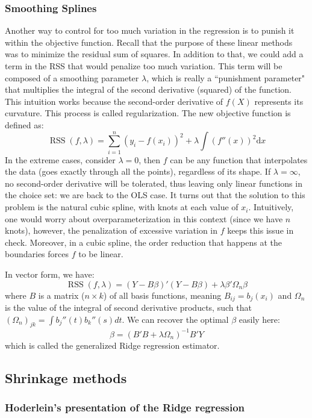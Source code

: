 \documentclass[12pt]{report}
\def\D{\mathrm{d}}
\def\D{\mathrm{d}}
\def\D{\mathrm{d}}
\begin{document}
\subsubsection{Smoothing Splines}

Another way to control for too much variation in the regression is to punish it within the objective function. Recall that the purpose of these linear methods was to minimize the residual sum of squares. In addition to that, we could add a term in the RSS that would penalize too much variation. This term will be composed of a smoothing parameter $\lambda$, which is really a ``punishment parameter" that multiplies the integral of the second derivative (squared) of the function. This intuition works because the second-order derivative of $f(X)$ represents its curvature. This process is called regularization. The new objective function is defined as: $$ \operatorname{RSS}(f,\lambda) = \sum_{i=1}^n (y_i - f(x_i))^2 + \lambda\int(f''(x))^2\D x $$
In the extreme cases, consider $\lambda = 0$, then $f$ can be any function that interpolates the data (goes exactly through all the points), regardless of its shape. If $\lambda = \infty$, no second-order derivative will be tolerated, thus leaving only linear functions in the choice set: we are back to the OLS case. It turns out that the solution to this problem is the natural cubic spline, with knots at each value of $x_i$. Intuitively, one would worry about overparameterization in this context (since we have $n$ knots), however, the penalization of excessive variation in $f$ keeps this issue in check. Moreover, in a cubic spline, the order reduction that happens at the boundaries forces $f$ to be linear.

In vector form, we have: $$\operatorname{RSS}(f,\lambda) = (Y - B\beta)'(Y - B\beta) + \lambda\beta'\Omega_n\beta $$ where $B$ is a matrix ($n\times k$) of all basis functions, meaning $B_{ij} = b_j(x_i)$ and $\Omega_n$ is the value of the integral of second derivative products, such that $(\Omega_n)_{jk} = \int b_j''(t)b_k''(s)dt$. We can recover the optimal $\beta$ easily here: $$\hat\beta = (B'B + \lambda\Omega_n)^{-1}B'Y $$ which is called the generalized Ridge regression estimator.

\subsection{Shrinkage methods}

\subsubsection{Hoderlein's presentation of the Ridge regression}
\end{document}
